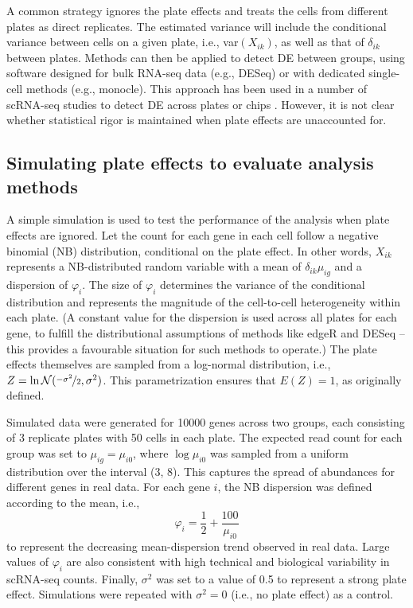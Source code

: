 \documentclass{article}
\begin{document}
A common strategy ignores the plate effects and treats the cells from different plates as direct replicates.
The estimated variance will include the conditional variance between cells on a given plate, i.e., var$(X_{ik})$, as well as that of $\delta_{ik}$ between plates.
Methods can then be applied to detect DE between groups, using software designed for bulk RNA-seq data (e.g., DESeq) or with dedicated single-cell methods (e.g., monocle).
This approach has been used in a number of scRNA-seq studies to detect DE across plates or chips \cite{kolod2015single,trapnell2014dynamics,avraham2015pathogen}.
However, it is not clear whether statistical rigor is maintained when plate effects are unaccounted for.


\subsection{Simulating plate effects to evaluate analysis methods}
A simple simulation is used to test the performance of the analysis when plate effects are ignored.
Let the count for each gene in each cell follow a negative binomial (NB) distribution, conditional on the plate effect.
In other words, $X_{ik}$ represents a NB-distributed random variable with a mean of $\delta_{ik}\mu_{ig}$ and a dispersion of $\varphi_{i}$.
The size of $\varphi_{i}$ determines the variance of the conditional distribution and represents the magnitude of the cell-to-cell heterogeneity within each plate.
(A constant value for the dispersion is used across all plates for each gene, to fulfill the distributional assumptions of methods like edgeR and DESeq
    -- this provides a favourable situation for such methods to operate.)
The plate effects themselves are sampled from a log-normal distribution, i.e., $Z = \ln \mathcal{N}(\nicefrac{-\sigma^2}{2}, \sigma^2)$.
This parametrization ensures that $E(Z)=1$, as originally defined.

Simulated data were generated for 10000 genes across two groups, each consisting of 3 replicate plates with 50 cells in each plate.
The expected read count for each group was set to $\mu_{ig}=\mu_{i0}$, where $\log \mu_{i0}$ was sampled from a uniform distribution over the interval (3, 8).
This captures the spread of abundances for different genes in real data. 
For each gene $i$, the NB dispersion was defined according to the mean, i.e., 
\[
    \varphi_{i} = \frac{1}{2} + \frac{100}{\mu_{i0}} 
\]
to represent the decreasing mean-dispersion trend observed in real data.
Large values of $\varphi_{i}$ are also consistent with high technical and biological variability in scRNA-seq counts.
Finally, $\sigma^2$ was set to a value of 0.5 to represent a strong plate effect.
Simulations were repeated with $\sigma^2=0$ (i.e., no plate effect) as a control. 
\end{document}
